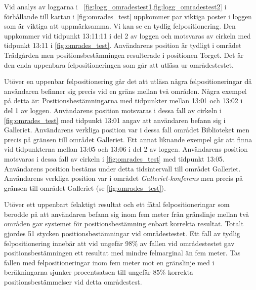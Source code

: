 \documentclass[a4paper,12pt]{article}
\begin{document}
 Vid analys av loggarna i ~\cref{fig:logg_omradestest1,fig:logg_omradestest2} i förhållande till kartan i \cref{fig:omrades_test} uppkommer par viktiga poster i loggen som är viktiga att uppmärksamma.
 Vi kan se en tydlig felpositionering. Den uppkommer vid tidpunkt 13:11:11 i del 2 av loggen och motsvaras av cirkeln med tidpunkt 13:11 i \cref{fig:omrades_test}. Användarens position är tydligt i området Trädgården men positionsbestämningen resulterade i positionen Torget. Det är den enda uppenbara felpositioneringen som går att utläsa ur områdestestet.

 Utöver en uppenbar felpositionering går det att utläsa några felpositioneringar då användaren befinner sig precis vid en gräns mellan två områden. Några exempel på detta är:
 Positionsbestämningarna med tidpunkter mellan 13:01 och 13:02 i del 1 av loggen. Användarens position motsvaras i dessa fall av cirkeln i \cref{fig:omrades_test} med tidpunkt 13:01 angav att användaren befann sig i Galleriet. Användarens verkliga position var i dessa fall området Biblioteket men precis på gränsen till området Galleriet.
 Ett annat liknande exempel går att finna vid tidpunkterna mellan 13:05 och 13:06 i del 2 av loggen. Användarens position motsvaras i dessa fall av cirkeln i \cref{fig:omrades_test} med tidpunkt 13:05. Användarens position bestäms under detta tidsintervall till området Galleriet. Användarens verkliga position var i området \textit{Galleriet-konferens} men precis på gränsen till området Galleriet (se \cref{fig:omrades_test}).

 Utöver ett uppenbart felaktigt resultat och ett fåtal felpositioneringar som berodde på att användaren befann sig inom fem meter från gränslinje mellan två områden gav systemet för positionsbestämning enbart korrekta resultat. Totalt gjordes 51 stycken positionsbestämningar vid områdestestet. Ett fall av tydlig felpositionering innebär att vid ungefär 98\% av fallen vid områdestestet gav positionsbestämningen ett resultat med mindre felmarginal än fem meter. Tas fallen med felpositioneringar inom fem meter mot en gränslinje med i beräkningarna sjunker procentsatsen till ungefär 85\% korrekta positionsbestämmelser vid detta områdestest.
\end{document}
